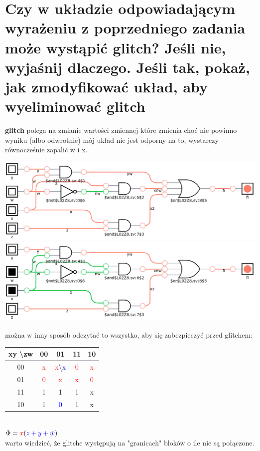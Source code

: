 \documentclass{article}
\begin{document}
\section{Czy w układzie odpowiadającym wyrażeniu z poprzedniego zadania może wystąpić glitch? Jeśli nie, wyjaśnij dlaczego. Jeśli tak, pokaż, jak zmodyfikować układ, aby wyeliminować glitch}
\textbf{glitch} polega na zmianie wartości zmiennej które zmienia choć nie powinno wyniku (albo odwrotnie)
mój układ nie jest odporny na to, wystarczy równocześnie zapalić w i x.\\
\begin{center}

	\includegraphics[scale=0.2]{./L02Z08.png}
	\includegraphics[scale=0.2]{./L02Z08czII.png}
\end{center}
można w inny sposób odczytać to wszystko, aby się zabezpieczyć przed glitchem:\\
\begin{center}
	 \begin{tabular}{|c|c|c|c|c|} 
	 \hline
	xy \textbackslash zw& 00 & 01 & 11 & 10\\ 
	 \hline
	 00&\textcolor{red}x&\textcolor{red}x\textbackslash \textcolor{blue}x &\textcolor{red}0&\textcolor{red}x \\ \hline
	 01&\textcolor{red}0&\textcolor{red}x&\textcolor{red}x&\textcolor{red}0\\ \hline
	 11&1&1&1&x \\ \hline
	 10&1&\textcolor{blue}0&1&x \\ \hline
	 \end{tabular}\\
	 $\Phi = \textcolor{red}{x}(\textcolor{blue}{z+y+ \bar{w}})$\\
	 warto wiedzieć, że glitche występują na "granicach" bloków o ile nie są połączone.
\end{center}
\end{document}
